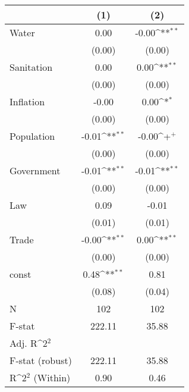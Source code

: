{
\def\sym#1{\ifmmode^{#1}\else\(^{#1}\)\fi}
\begin{tabular}{@{\extracolsep{2pt}}l*{2}{c}@{}}
\hline\hline


 & (1) & (2) \\
\hline
Water & 0.00 & -0.00\sym{**} \\
 & (0.00) & (0.00) \\
Sanitation & 0.00 & 0.00\sym{**} \\
 & (0.00) & (0.00) \\
Inflation & -0.00 & 0.00\sym{*} \\
 & (0.00) & (0.00) \\
Population & -0.01\sym{**} & -0.00\sym{+} \\
 & (0.00) & (0.00) \\
Government & -0.01\sym{**} & -0.01\sym{**} \\
 & (0.00) & (0.00) \\
Law & 0.09 & -0.01 \\
 & (0.01) & (0.01) \\
Trade & -0.00\sym{**} & 0.00\sym{**} \\
 & (0.00) & (0.00) \\
const & 0.48\sym{**} & 0.81 \\
 & (0.08) & (0.04) \\

\hline
N & 102 & 102 \\
F-stat & 222.11 & 35.88 \\
Adj. R\sym{2} &  &  \\
F-stat (robust) & 222.11 & 35.88 \\
R\sym{2} (Within) & 0.90 & 0.46 \\
\hline\hline
\end{tabular}
}